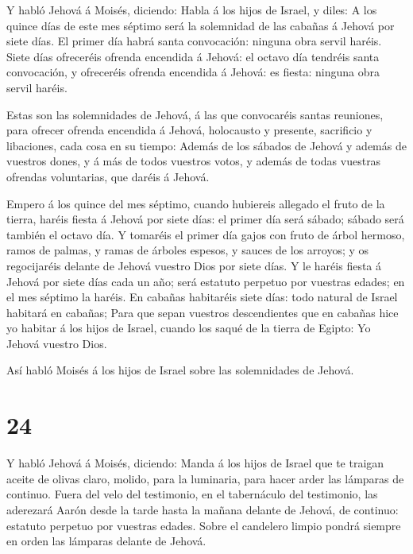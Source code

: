  Y habló Jehová á Moisés, diciendo:  Habla á
los hijos de Israel, y diles: A los quince días de este mes séptimo será
la solemnidad de las cabañas á Jehová por siete días.  El
primer día habrá santa convocación: ninguna obra servil haréis.
 Siete días ofreceréis ofrenda encendida á Jehová: el
octavo día tendréis santa convocación, y ofreceréis ofrenda encendida á
Jehová: es fiesta: ninguna obra servil haréis.

 Estas son las solemnidades de Jehová, á las que
convocaréis santas reuniones, para ofrecer ofrenda encendida á Jehová,
holocausto y presente, sacrificio y libaciones, cada cosa en su tiempo:
 Además de los sábados de Jehová y además de vuestros
dones, y á más de todos vuestros votos, y además de todas vuestras
ofrendas voluntarias, que daréis á Jehová.

 Empero á los quince del mes séptimo, cuando hubiereis
allegado el fruto de la tierra, haréis fiesta á Jehová por siete días:
el primer día será sábado; sábado será también el octavo día.
 Y tomaréis el primer día gajos con fruto de árbol hermoso,
ramos de palmas, y ramas de árboles espesos, y sauces de los arroyos; y
os regocijaréis delante de Jehová vuestro Dios por siete días.
 Y le haréis fiesta á Jehová por siete días cada un año;
será estatuto perpetuo por vuestras edades; en el mes séptimo la haréis.
 En cabañas habitaréis siete días: todo natural de Israel
habitará en cabañas;  Para que sepan vuestros descendientes
que en cabañas hice yo habitar á los hijos de Israel, cuando los saqué
de la tierra de Egipto: Yo Jehová vuestro Dios.

 Así habló Moisés á los hijos de Israel sobre las
solemnidades de Jehová.

\hypertarget{section-23}{%
\section{24}\label{section-23}}

 Y habló Jehová á Moisés, diciendo:  Manda á los
hijos de Israel que te traigan aceite de olivas claro, molido, para la
luminaria, para hacer arder las lámparas de continuo.  Fuera
del velo del testimonio, en el tabernáculo del testimonio, las aderezará
Aarón desde la tarde hasta la mañana delante de Jehová, de continuo:
estatuto perpetuo por vuestras edades.  Sobre el candelero
limpio pondrá siempre en orden las lámparas delante de Jehová.

